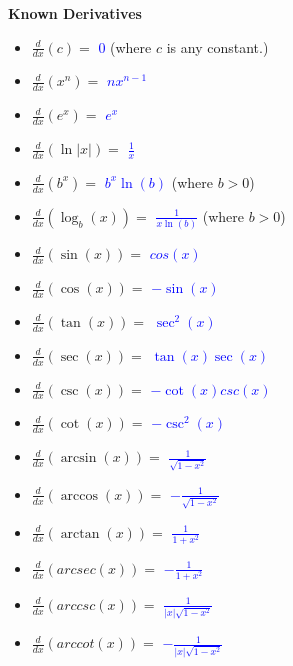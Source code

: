 \documentclass{ximera}
\begin{document}
\begin{exercise}
   \textbf{Known Derivatives}
   \begin{itemize}
    \item $\frac{d}{dx}(c)=$ \textcolor{blue}{$0$} (where $c$ is any constant.) 
    \item $\frac{d}{dx}(x^n)=$ \textcolor{blue}{$nx^{n-1}$}
    \item $\frac{d}{dx}(e^x)=$ \textcolor{blue}{$e^x$}
    \item $\frac{d}{dx}(\ln|x|)=$ \textcolor{blue}{$\frac{1}{x}$}
    \item $\frac{d}{dx}(b^x)=$ \textcolor{blue}{$b^x\ln(b)$} (where $b>0$) 
    \item $\frac{d}{dx}(\log_b(x))=$ \textcolor{blue}{$\frac{1}{x\ln(b)}$} (where $b>0$)
    \item $\frac{d}{dx}(\sin(x))=$ \textcolor{blue}{$cos(x)$}
    \item $\frac{d}{dx}(\cos(x))=$ \textcolor{blue}{$-\sin(x)$}
    \item $\frac{d}{dx}(\tan(x))=$ \textcolor{blue}{$\sec^2(x)$}
    \item $\frac{d}{dx}(\sec(x))=$ \textcolor{blue}{$\tan(x)\sec(x)$}
    \item $\frac{d}{dx}(\csc(x))=$ \textcolor{blue}{$-\cot(x)csc(x)$}
    \item $\frac{d}{dx}(\cot(x))=$ \textcolor{blue}{$-\csc^2(x)$}
    \item $\frac{d}{dx}(\arcsin(x))=$ \textcolor{blue}{$\frac{1}{\sqrt{1-x^2}}$}
    \item $\frac{d}{dx}(\arccos(x))=$ \textcolor{blue}{$-\frac{1}{\sqrt{1-x^2}}$}
    \item $\frac{d}{dx}(\arctan(x))=$ \textcolor{blue}{$\frac{1}{1+x^2}$}
    \item $\frac{d}{dx}(arcsec(x))=$ \textcolor{blue}{$-\frac{1}{1+x^2}$}
    \item $\frac{d}{dx}(arccsc(x))=$ \textcolor{blue}{$\frac{1}{|x|\sqrt{1-x^2}}$}
    \item $\frac{d}{dx}(arccot(x))=$ \textcolor{blue}{$-\frac{1}{|x|\sqrt{1-x^2}}$}
   \end{itemize}
\end{exercise}
\end{document}
